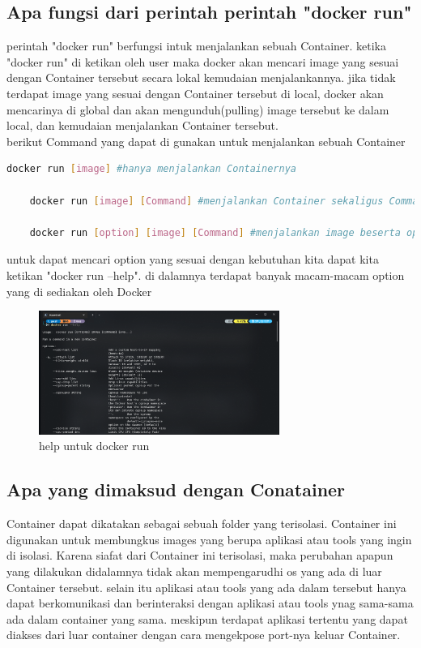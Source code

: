 \documentclass[11pt,a4paper]{article}
\begin{document}
\subsection{Apa fungsi dari perintah perintah "docker run"}
perintah "docker run" berfungsi intuk menjalankan sebuah Container. ketika "docker run" di ketikan 
oleh user maka docker akan mencari image yang sesuai dengan Container tersebut
secara lokal kemudaian menjalankannya. jika tidak terdapat image yang sesuai dengan Container tersebut di local,
docker akan mencarinya di global dan akan mengunduh(pulling) image tersebut ke dalam local, dan kemudaian menjalankan
Container tersebut.\\
berikut Command yang dapat di gunakan untuk menjalankan sebuah Container
\begin{lstlisting}[language = bash]
	docker run [image] #hanya menjalankan Containernya

	docker run [image] [Command] #menjalankan Container sekaligus Commandnya (contoh Command = echo)

	docker run [option] [image] [Command] #menjalankan image beserta option yang terdapat pada docker(Contoh option = -i)
\end{lstlisting}
untuk dapat mencari option yang sesuai dengan kebutuhan kita dapat kita ketikan "docker run --help".
di dalamnya terdapat banyak macam-macam option yang di sediakan oleh Docker
\begin{figure}[h]
	\centering
	\includegraphics[width = 0.7\textwidth]{Figure/asset/help run.png}
	\caption{help untuk docker run}
\end{figure}

\newpage


\subsection{Apa yang dimaksud dengan Conatainer}
Container dapat dikatakan sebagai sebuah folder yang terisolasi. Container ini digunakan untuk 
membungkus images yang berupa aplikasi atau tools yang ingin di isolasi. Karena siafat 
dari Container ini terisolasi, maka perubahan apapun yang dilakukan didalamnya tidak akan
mempengarudhi os yang ada di luar Container tersebut. selain itu aplikasi atau tools yang 
ada dalam tersebut hanya dapat berkomunikasi dan berinteraksi dengan aplikasi atau tools ynag
sama-sama ada dalam container yang sama. meskipun terdapat aplikasi tertentu yang dapat 
diakses dari luar container dengan cara  mengekpose port-nya keluar Container.
\end{document}

